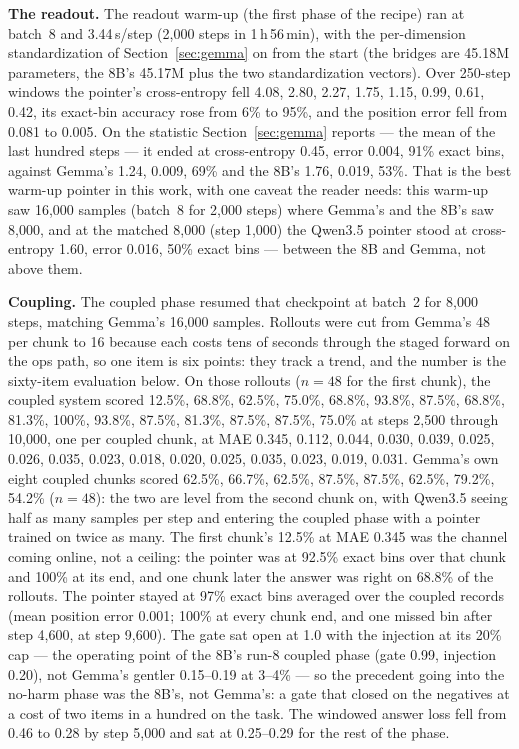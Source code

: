 \documentclass[11pt]{article}
\begin{document}
\textbf{The readout.} The readout warm-up (the first phase of the recipe) ran at batch~8 and 3.44\,s/step (2,000 steps in 1\,h\,56\,min), with the per-dimension standardization of Section~\ref{sec:gemma} on from the start (the bridges are 45.18M parameters, the 8B's 45.17M plus the two standardization vectors). Over 250-step windows the pointer's cross-entropy fell 4.08, 2.80, 2.27, 1.75, 1.15, 0.99, 0.61, 0.42, its exact-bin accuracy rose from 6\% to 95\%, and the position error fell from 0.081 to 0.005. On the statistic Section~\ref{sec:gemma} reports --- the mean of the last hundred steps --- it ended at cross-entropy 0.45, error 0.004, 91\% exact bins, against Gemma's 1.24, 0.009, 69\% and the 8B's 1.76, 0.019, 53\%. That is the best warm-up pointer in this work, with one caveat the reader needs: this warm-up saw 16,000 samples (batch~8 for 2,000 steps) where Gemma's and the 8B's saw 8,000, and at the matched 8,000 (step 1,000) the Qwen3.5 pointer stood at cross-entropy 1.60, error 0.016, 50\% exact bins --- between the 8B and Gemma, not above them.

\textbf{Coupling.} The coupled phase resumed that checkpoint at batch~2 for 8,000 steps, matching Gemma's 16,000 samples. Rollouts were cut from Gemma's 48 per chunk to 16 because each costs tens of seconds through the staged forward on the ops path, so one item is six points: they track a trend, and the number is the sixty-item evaluation below. On those rollouts ($n{=}48$ for the first chunk), the coupled system scored 12.5\%, 68.8\%, 62.5\%, 75.0\%, 68.8\%, 93.8\%, 87.5\%, 68.8\%, 81.3\%, 100\%, 93.8\%, 87.5\%, 81.3\%, 87.5\%, 87.5\%, 75.0\% at steps 2,500 through 10,000, one per coupled chunk, at MAE 0.345, 0.112, 0.044, 0.030, 0.039, 0.025, 0.026, 0.035, 0.023, 0.018, 0.020, 0.025, 0.035, 0.023, 0.019, 0.031. Gemma's own eight coupled chunks scored 62.5\%, 66.7\%, 62.5\%, 87.5\%, 87.5\%, 62.5\%, 79.2\%, 54.2\% ($n{=}48$): the two are level from the second chunk on, with Qwen3.5 seeing half as many samples per step and entering the coupled phase with a pointer trained on twice as many. The first chunk's 12.5\% at MAE 0.345 was the channel coming online, not a ceiling: the pointer was at 92.5\% exact bins over that chunk and 100\% at its end, and one chunk later the answer was right on 68.8\% of the rollouts. The pointer stayed at 97\% exact bins averaged over the coupled records (mean position error 0.001; 100\% at every chunk end, and one missed bin after step 4,600, at step 9,600). The gate sat open at 1.0 with the injection at its 20\% cap --- the operating point of the 8B's run-8 coupled phase (gate 0.99, injection 0.20), not Gemma's gentler 0.15--0.19 at 3--4\% --- so the precedent going into the no-harm phase was the 8B's, not Gemma's: a gate that closed on the negatives at a cost of two items in a hundred on the task. The windowed answer loss fell from 0.46 to 0.28 by step 5,000 and sat at 0.25--0.29 for the rest of the phase.
\end{document}
